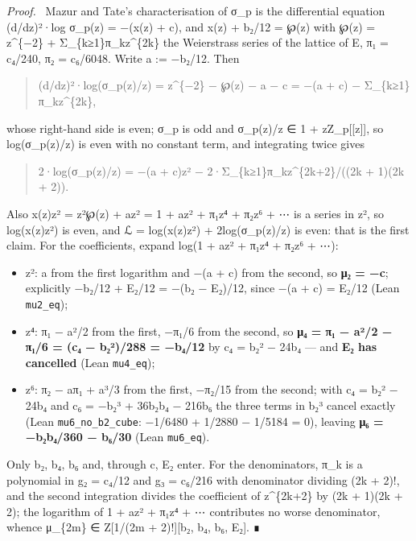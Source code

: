 \documentclass[11pt,a4paper]{article}
\theoremstyle{named}
\newenvironment{mdproof}[1][Proof]{\par\medskip\noindent\textit{#1.}\ }{\par\medskip}
\begin{document}
\begin{mdproof}[Proof]
Mazur and Tate's characterisation of σ\_p is the differential equation (d/dz)²·log σ\_p(z) = −(x(z) + c), and x(z) + b₂/12 = ℘(z) with ℘(z) = z\textasciicircum{}\{−2\} + Σ\_\{k≥1\}π\_kz\textasciicircum{}\{2k\} the Weierstrass series of the lattice of E, π₁ = c₄/240, π₂ = c₆/6048. Write a := −b₂/12. Then
\end{mdproof}

\begin{quote}
(d/dz)²·log(σ\_p(z)/z) = z\textasciicircum{}\{−2\} − ℘(z) − a − c = −(a + c) − Σ\_\{k≥1\}π\_kz\textasciicircum{}\{2k\},
\end{quote}

whose right-hand side is even; σ\_p is odd and σ\_p(z)/z ∈ 1 + zZ\_p[[z]], so log(σ\_p(z)/z) is even with no constant term, and integrating twice gives

\begin{quote}
2·log(σ\_p(z)/z) = −(a + c)z² − 2·Σ\_\{k≥1\}π\_kz\textasciicircum{}\{2k+2\}/((2k + 1)(2k + 2)).
\end{quote}

Also x(z)z² = z²℘(z) + az² = 1 + az² + π₁z⁴ + π₂z⁶ + ⋯ is a series in z², so log(x(z)z²) is even, and ℒ = log(x(z)z²) + 2log(σ\_p(z)/z) is even: that is the first claim. For the coefficients, expand log(1 + az² + π₁z⁴ + π₂z⁶ + ⋯):

\begin{itemize}[leftmargin=1.4em,itemsep=.2em,topsep=.3em]
\item z²: a from the first logarithm and −(a + c) from the second, so \textbf{μ₂ = −c}; explicitly −b₂/12 + E₂/12 = −(b₂ − E₂)/12, since −(a + c) = E₂/12 (Lean \texttt{mu2\_\allowbreak{}eq});
\item z⁴: π₁ − a²/2 from the first, −π₁/6 from the second, so \textbf{μ₄ = π₁ − a²/2 − π₁/6 = (c₄ − b₂²)/288 = −b₄/12} by c₄ = b₂² − 24b₄ — and \textbf{E₂ has cancelled} (Lean \texttt{mu4\_\allowbreak{}eq});
\item z⁶: π₂ − aπ₁ + a³/3 from the first, −π₂/15 from the second; with c₄ = b₂² − 24b₄ and c₆ = −b₂³ + 36b₂b₄ − 216b₆ the three terms in b₂³ cancel exactly (Lean \texttt{mu6\_\allowbreak{}no\_\allowbreak{}b2\_\allowbreak{}cube}: −1/6480 + 1/2880 − 1/5184 = 0), leaving \textbf{μ₆ = −b₂b₄/360 − b₆/30} (Lean \texttt{mu6\_\allowbreak{}eq}).
\end{itemize}

Only b₂, b₄, b₆ and, through c, E₂ enter. For the denominators, π\_k is a polynomial in g₂ = c₄/12 and g₃ = c₆/216 with denominator dividing (2k + 2)!, and the second integration divides the coefficient of z\textasciicircum{}\{2k+2\} by (2k + 1)(2k + 2); the logarithm of 1 + az² + π₁z⁴ + ⋯ contributes no worse denominator, whence μ\_\{2m\} ∈ Z[1/(2m + 2)!][b₂, b₄, b₆, E₂]. ∎
\end{document}
